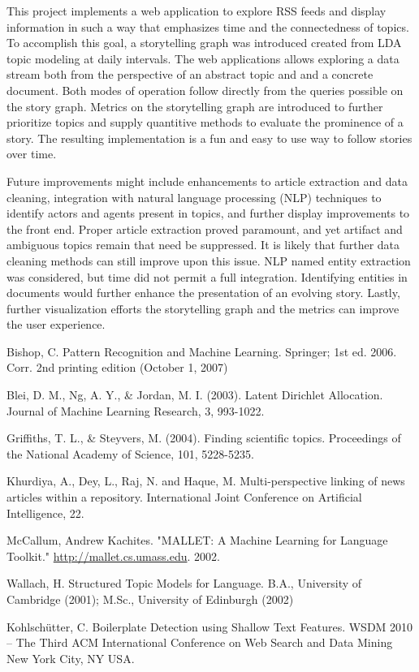 \documentclass[10pt]{article}
\begin{document}
This project implements a web application to explore RSS feeds and display information in such a way that emphasizes time and the connectedness of topics.  To accomplish this goal, a storytelling graph was introduced created from LDA topic modeling at daily intervals.  The web applications allows exploring a data stream both from the perspective of an abstract topic and and a concrete document.  Both modes of operation follow directly from the queries possible on the story graph.  Metrics on the storytelling graph are introduced to further prioritize topics and supply quantitive methods to evaluate the prominence of a story.  The resulting implementation is a fun and easy to use way to follow stories over time.

Future improvements might include enhancements to article extraction and data cleaning, integration with natural language processing (NLP) techniques to identify actors and agents present in topics, and further display improvements to the front end.  Proper article extraction proved paramount, and yet artifact and ambiguous topics remain that need be suppressed.  It is likely that further data cleaning methods can still improve upon this issue.  NLP named entity extraction was considered, but time did not permit a full integration.  Identifying entities in documents would further enhance the presentation of an evolving story.  Lastly, further visualization efforts the storytelling graph and the metrics can improve the user experience.  

\begin{thebibliography}{9}
 Bishop, C.  Pattern Recognition and Machine Learning.  
Springer; 1st ed. 2006. Corr. 2nd printing edition (October 1, 2007)

 Blei, D. M., Ng, A. Y., & Jordan, M. I. (2003). Latent Dirichlet Allocation. Journal of Machine Learning Research,
3, 993-1022.

 Griffiths, T. L., & Steyvers, M. (2004). Finding scientific topics. Proceedings of the National Academy of Science, 101, 5228-5235.

 Khurdiya, A., Dey, L., Raj, N. and  Haque, M. Multi-perspective linking of news articles within a repository. International Joint Conference on Artificial Intelligence, 22.

  McCallum, Andrew Kachites.  "MALLET: A Machine Learning for Language Toolkit." \url{http://mallet.cs.umass.edu}. 2002.

 Wallach, H. Structured Topic Models for Language. B.A., University of Cambridge (2001); M.Sc., University of Edinburgh (2002)

 Kohlschütter, C. Boilerplate Detection using Shallow Text Features. WSDM 2010 -- The Third ACM International Conference on Web Search and Data Mining New York City, NY USA.

\end{thebibliography}
\end{document}
